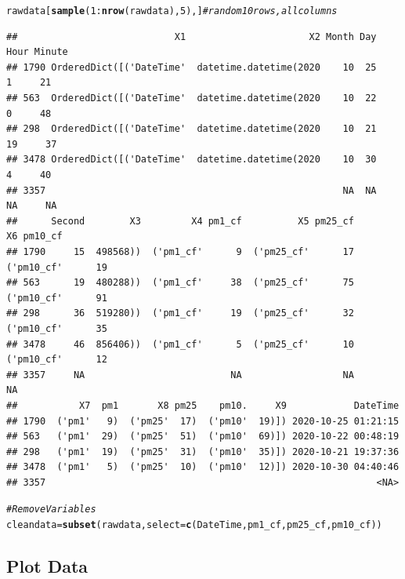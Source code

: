 \documentclass{article}\usepackage[]{graphicx}\usepackage[]{color}
\makeatletter
\newcommand{\hlnum}[1]{\textcolor[rgb]{0.686,0.059,0.569}{#1}}%
\newcommand{\hlcom}[1]{\textcolor[rgb]{0.678,0.584,0.686}{\textit{#1}}}%
\newcommand{\hlopt}[1]{\textcolor[rgb]{0,0,0}{#1}}%
\newcommand{\hlstd}[1]{\textcolor[rgb]{0.345,0.345,0.345}{#1}}%
\newcommand{\hlkwb}[1]{\textcolor[rgb]{0.69,0.353,0.396}{#1}}%
\newcommand{\hlkwc}[1]{\textcolor[rgb]{0.333,0.667,0.333}{#1}}%
\newcommand{\hlkwd}[1]{\textcolor[rgb]{0.737,0.353,0.396}{\textbf{#1}}}%
\newenvironment{kframe}{%
 \def\at@end@of@kframe{}%
 \ifinner\ifhmode%
  \def\at@end@of@kframe{\end{minipage}}%
  \begin{minipage}{\columnwidth}%
 \fi\fi%
 \def\FrameCommand##1{\hskip\@totalleftmargin \hskip-\fboxsep
 \colorbox{shadecolor}{##1}\hskip-\fboxsep
     \hskip-\linewidth \hskip-\@totalleftmargin \hskip\columnwidth}%
 \MakeFramed {\advance\hsize-\width
   \@totalleftmargin\z@ \linewidth\hsize
   \@setminipage}}%
 {\par\unskip\endMakeFramed%
 \at@end@of@kframe}
\newenvironment{knitrout}{}{} %
\makeatother
\begin{document}
\begin{knitrout}
\color{fgcolor}\begin{kframe}
\begin{alltt}
\hlstd{rawdata[}\hlkwd{sample}\hlstd{(}\hlnum{1}\hlopt{:}\hlkwd{nrow}\hlstd{(rawdata),} \hlnum{5}\hlstd{),]} \hlcom{# random 10 rows, all columns}
\end{alltt}
\begin{verbatim}
##                            X1                      X2 Month Day Hour Minute
## 1790 OrderedDict([('DateTime'  datetime.datetime(2020    10  25    1     21
## 563  OrderedDict([('DateTime'  datetime.datetime(2020    10  22    0     48
## 298  OrderedDict([('DateTime'  datetime.datetime(2020    10  21   19     37
## 3478 OrderedDict([('DateTime'  datetime.datetime(2020    10  30    4     40
## 3357                                                     NA  NA   NA     NA
##      Second        X3         X4 pm1_cf          X5 pm25_cf          X6 pm10_cf
## 1790     15  498568))  ('pm1_cf'      9  ('pm25_cf'      17  ('pm10_cf'      19
## 563      19  480288))  ('pm1_cf'     38  ('pm25_cf'      75  ('pm10_cf'      91
## 298      36  519280))  ('pm1_cf'     19  ('pm25_cf'      32  ('pm10_cf'      35
## 3478     46  856406))  ('pm1_cf'      5  ('pm25_cf'      10  ('pm10_cf'      12
## 3357     NA                          NA                  NA                  NA
##           X7  pm1       X8 pm25    pm10.     X9            DateTime
## 1790  ('pm1'   9)  ('pm25'  17)  ('pm10'  19)]) 2020-10-25 01:21:15
## 563   ('pm1'  29)  ('pm25'  51)  ('pm10'  69)]) 2020-10-22 00:48:19
## 298   ('pm1'  19)  ('pm25'  31)  ('pm10'  35)]) 2020-10-21 19:37:36
## 3478  ('pm1'   5)  ('pm25'  10)  ('pm10'  12)]) 2020-10-30 04:40:46
## 3357                                                           <NA>
\end{verbatim}
\begin{alltt}
\hlcom{# Remove Variables}
\hlstd{cleandata} \hlkwb{=} \hlkwd{subset}\hlstd{(rawdata,} \hlkwc{select}\hlstd{=}\hlkwd{c}\hlstd{(DateTime, pm1_cf, pm25_cf, pm10_cf))}
\end{alltt}
\end{kframe}
\end{knitrout}

\subsection{Plot Data}
\end{document}
